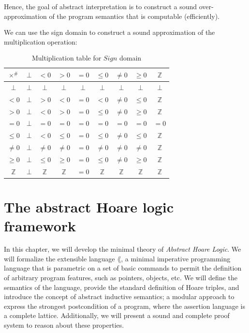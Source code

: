 \documentclass[
  10pt,       %
  twoside,    %
  a4paper,    %
  english,    %
  tikz,       %
  openright,  %
]{book}
\begin{document}
Hence, the goal of abstract interpretation is to construct a sound 
over-approximation of the program semantics that is computable (efficiently).

\begin{example}
  We can use the sign domain to construct a sound approximation of the
  multiplication operation: 
  \begin{table}[h!]
    \centering
    \begin{tabular}{|c|c|c|c|c|c|c|c|c|}
      \hline
      $\times^\#$ & $\bot$ & $< 0$ & $> 0$ & $= 0$ & $\le 0$ & $\ne 0$ & $\ge 0$ 
                  & $\mathbb{Z}$ \\
      \hline
      $\bot$ & $\bot$ & $\bot$ & $\bot$ & $\bot$ & $\bot$ & $\bot$ & $\bot$ 
             & $\bot$ \\
      \hline
      $< 0$ & $\bot$ & $> 0$ & $< 0$ & $= 0$ & $< 0$ & $\ne 0$ & $\le 0$ 
            & $\mathbb{Z}$ \\
      \hline
      $> 0$ & $\bot$ & $< 0$ & $> 0$ & $= 0$ & $\le 0$ & $\ne 0$ & $\ge 0$ 
            & $\mathbb{Z}$ \\
      \hline
      $= 0$ & $\bot$ & $= 0$ & $= 0$ & $= 0$ & $= 0$ & $= 0$ & $= 0$ & $= 0$ \\
      \hline
      $\le 0$ & $\bot$ & $< 0$ & $\le 0$ & $= 0$ & $\le 0$ & $\ne 0$ & $\le 0$ 
              & $\mathbb{Z}$ \\
      \hline
      $\ne 0$ & $\bot$ & $\ne 0$ & $\ne 0$ & $= 0$ & $\ne 0$ & $\ne 0$ 
              & $\ne 0$ & $\mathbb{Z}$ \\
      \hline
      $\ge 0$ & $\bot$ & $\le 0$ & $\ge 0$ & $= 0$ & $\le 0$ & $\ne 0$ 
              & $\ge 0$ & $\mathbb{Z}$ \\
      \hline
      $\mathbb{Z}$ & $\bot$ & $\mathbb{Z}$ & $\mathbb{Z}$ & $= 0$ 
                   & $\mathbb{Z}$ & $\mathbb{Z}$ & $\mathbb{Z}$ & $\mathbb{Z}$ \\
      \hline
    \end{tabular}
    \caption{Multiplication table for $Sign$ domain}
  \end{table}
\end{example}
\chapter{The abstract Hoare logic framework}


In this chapter, we will develop the minimal theory of \textit{Abstract Hoare
Logic}. We will formalize the extensible language $\lang$, a minimal imperative
programming language that is parametric on a set of basic commands to permit
the definition of arbitrary program features, such as pointers, objects, etc.
We will define the semantics of the language, provide the standard definition
of Hoare triples, and introduce the concept of abstract inductive semantics; a
modular approach to express the strongest postcondition of a program, where the
assertion language is a complete lattice. Additionally, we will present a sound
and complete proof system to reason about these properties.
\end{document}
